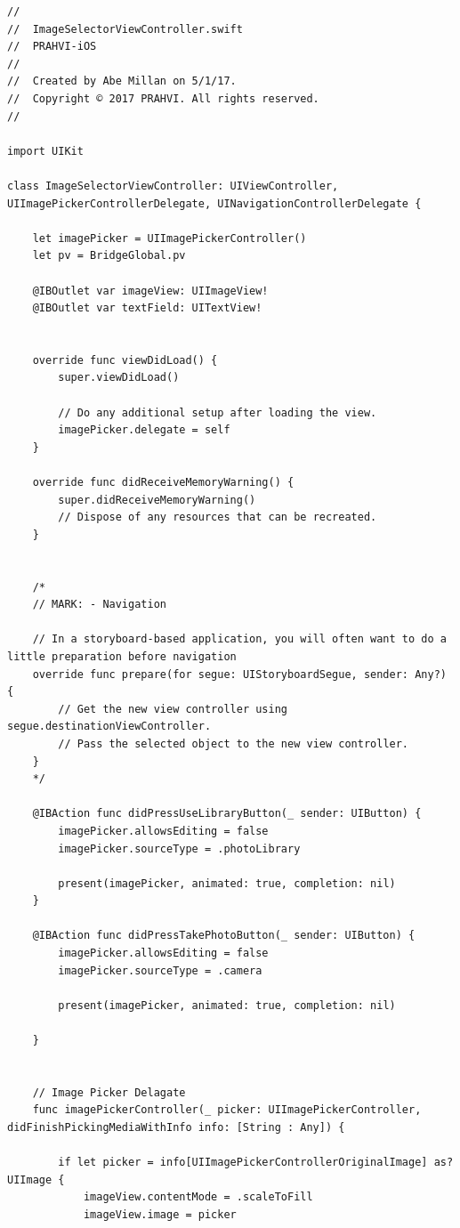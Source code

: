 \begin{lstlisting}
//
//  ImageSelectorViewController.swift
//  PRAHVI-iOS
//
//  Created by Abe Millan on 5/1/17.
//  Copyright © 2017 PRAHVI. All rights reserved.
//

import UIKit

class ImageSelectorViewController: UIViewController, UIImagePickerControllerDelegate, UINavigationControllerDelegate {
    
    let imagePicker = UIImagePickerController()
    let pv = BridgeGlobal.pv
    
    @IBOutlet var imageView: UIImageView!
    @IBOutlet var textField: UITextView!
    
    
    override func viewDidLoad() {
        super.viewDidLoad()

        // Do any additional setup after loading the view.
        imagePicker.delegate = self
    }

    override func didReceiveMemoryWarning() {
        super.didReceiveMemoryWarning()
        // Dispose of any resources that can be recreated.
    }
    

    /*
    // MARK: - Navigation

    // In a storyboard-based application, you will often want to do a little preparation before navigation
    override func prepare(for segue: UIStoryboardSegue, sender: Any?) {
        // Get the new view controller using segue.destinationViewController.
        // Pass the selected object to the new view controller.
    }
    */
    
    @IBAction func didPressUseLibraryButton(_ sender: UIButton) {
        imagePicker.allowsEditing = false
        imagePicker.sourceType = .photoLibrary
        
        present(imagePicker, animated: true, completion: nil)
    }
    
    @IBAction func didPressTakePhotoButton(_ sender: UIButton) {
        imagePicker.allowsEditing = false
        imagePicker.sourceType = .camera
        
        present(imagePicker, animated: true, completion: nil)

    }
    
    
    // Image Picker Delagate
    func imagePickerController(_ picker: UIImagePickerController, didFinishPickingMediaWithInfo info: [String : Any]) {
        
        if let picker = info[UIImagePickerControllerOriginalImage] as? UIImage {
            imageView.contentMode = .scaleToFill
            imageView.image = picker
            

\end{lstlisting}
